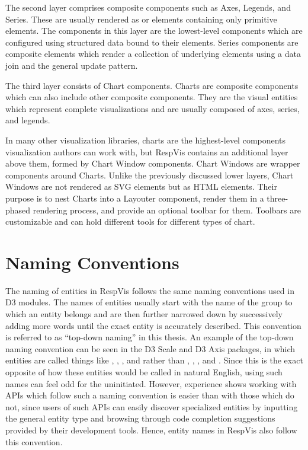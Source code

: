 The second layer comprises composite components such as Axes, Legends,
and Series. These are usually rendered as  or 
elements containing only primitive elements. The components in this
layer are the lowest-level components which are configured using
structured data bound to their elements. Series components are
composite elements which render a collection of underlying elements
using a data join and the general update pattern.

The third layer consists of Chart components. Charts are composite
components which can also include other composite components. They are
the visual entities which represent complete visualizations and are
usually composed of axes, series, and legends.

In many other visualization libraries, charts are the highest-level
components visualization authors can work with, but RespVis contains
an additional layer above them, formed by Chart Window components.
Chart Windows are wrapper components around Charts. Unlike the
previously discussed lower layers, Chart Windows are not rendered as
SVG elements but as HTML  elements. Their purpose is to
nest Charts into a Layouter component, render them in a three-phased
rendering process, and provide an optional toolbar for them. Toolbars
are customizable and can hold different tools for different types of
chart.








\section{Naming Conventions}
\label{sec:NamingConventions}

The naming of entities in RespVis follows the same naming conventions
used in D3 modules. The names of entities usually start with the name
of the group to which an entity belongs and are then further narrowed
down by successively adding more words until the exact entity is
accurately described. This convention is referred to as
\enquote{top-down naming} in this thesis. An example of the top-down
naming convention can be seen in the D3 Scale
\parencite{D3Scale} and D3 Axis \parencite{D3Axis} packages, in
which entities are called things like ,
, , and  rather
than , , , and
. Since this is the exact opposite of how these
entities would be called in natural English, using such names
can feel odd for the uninitiated. However, experience shows working
with APIs which follow such a naming convention is easier than with
those which do not, since users of such APIs can easily discover
specialized entities by inputting the general entity type and browsing
through code completion suggestions provided by their development
tools. Hence, entity names in RespVis also follow this convention.

